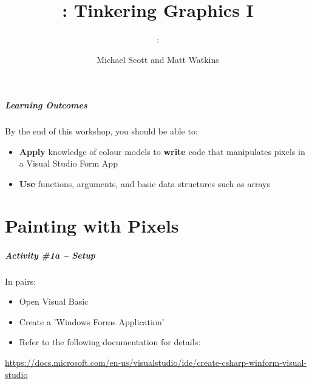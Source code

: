 \usepackage{../../beamerthemeFalmouthGamesAcademy}
\usepackage{multimedia}
\graphicspath{ {../../} }


\usepackage[normalem]{ulem}
\usepackage{wasysym}

\usepackage{pdfpages}

\usetikzlibrary{arrows,automata}

\title{\sessionnumber: Tinkering Graphics I}
\subtitle{\modulecode: \moduletitle}
\author{Michael Scott and Matt Watkins}






\maketitle

\begin{frame}
	\frametitle{Learning Outcomes}
	By the end of this workshop, you should be able to:	
	\begin{itemize}
		\item \textbf{Apply} knowledge of colour models to \textbf{write} code that manipulates pixels in a Visual Studio Form App
		\item \textbf{Use} functions, arguments, and basic data structures such as arrays
	\end{itemize}
\end{frame}

\part{Painting with Pixels}
\frame{\partpage}

\begin{frame}
	\frametitle{Activity \#1a -- Setup}
	
	In pairs:
	
	\vspace{2em}
	
	\begin{itemize}		
		\item Open Visual Basic 
		\item Create a 'Windows Forms Application'
		\item Refer to the following documentation for details:
	\end{itemize}
\scriptsize \url{https://docs.microsoft.com/en-us/visualstudio/ide/create-csharp-winform-visual-studio}
\end{frame}

